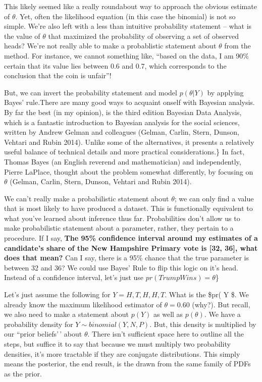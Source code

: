 \documentclass[
]{book}
\begin{document}
This likely seemed like a really roundabout way to approach the obvious estimate of \(\theta\). Yet, often the likelihood equation (in this case the binomial) is not so simple. We're also left with a less than intuitive probability statement -- what is the value of \(\theta\) that maximized the probability of observing a set of observed heads? We're not really able to make a probablistic statement about \(\theta\) from the method. For instance, we cannot something like, ``based on the data, I am 90\% certain that its value lies between 0.6 and 0.7, which corresponds to the conclusion that the coin is unfair''!

But, we can invert the probability statement and model \(p(\theta|Y)\) by applying Bayes' rule.There are many good ways to acquaint onself with Bayesian analysis. By far the best (in my opinion), is the third edition Bayesian Data Analysis, which is a fantastic introduction to Bayesian analysis for the social sciences, written by Andrew Gelman and colleagues (Gelman, Carlin, Stern, Dunson, Vehtari and Rubin 2014). Unlike some of the alternatives, it presents a relatively useful balance of technical details and more practical considerations.\} In fact, Thomas Bayes (an English reverend and mathematician) and independently, Pierre LaPlace, thought about the problem somewhat differently, by focusing on \(\theta\) (Gelman, Carlin, Stern, Dunson, Vehtari and Rubin 2014).

We can't really make a probabilistic statement about \(\theta\); we can only find a value that is most likely to have produced a dataset. This is functionally equivalent to what you've learned about inference thus far. Probabilities don't allow us to make probabilistic statement about a parameter, rather, they pertain to a procedure. If I say, \textbf{The 95\% confidence interval around my estimates of a candidate's share of the New Hampshire Primary vote is {[}32, 36{]}, what does that mean?} Can I say, there is a 95\% chance that the true parameter is between 32 and 36? We could use Bayes' Rule to flip this logic on it's head. Instead of a confidence interval, let's just use \(pr(TrumpWins)=\theta\)\}

Let's just assume the following for \(Y={H, T, H, H, T}\). What is the \$pr(\theta \textbar{} Y \$. We already know the maximum likelihood estimator of \(\theta=0.60\) (why?). But recall, we also need to make a statement about \(p(Y)\) as well as \(p(\theta)\). We have a probability density for \(Y \sim binomial(Y, N, P)\). But, this density is multiplied by our ``prior beliefs'\,' about \(\theta\). There isn't sufficient space here to outline all the steps, but suffice it to say that because we must multiply two probability densities, it's more tractable if they are conjugate distributions. This simply means the posterior, the end result, is the drawn from the same family of PDFs as the prior.
\end{document}
